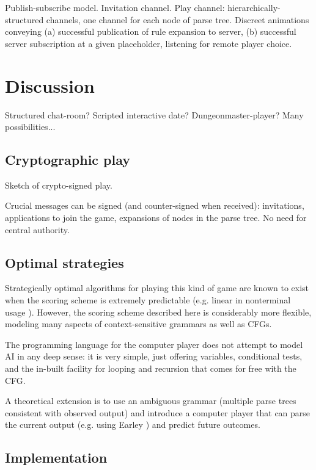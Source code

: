 \documentclass{acm_proc_article-sp}
\begin{document}
Publish-subscribe model.
Invitation channel.
Play channel: hierarchically-structured channels, one channel for each node of parse tree.
Discreet animations conveying (a) successful publication of rule expansion to server, (b) successful server subscription at a given placeholder, listening for remote player choice.

\section{Discussion}

Structured chat-room?
Scripted interactive date?
Dungeonmaster-player?
Many possibilities...


\subsection{Cryptographic play}

Sketch of crypto-signed play.

Crucial messages can be signed (and counter-signed when received): invitations, applications to join the game, expansions of nodes in the parse tree.
No need for central authority.

\subsection{Optimal strategies}

Strategically optimal algorithms for playing this kind of game are known to exist when the scoring scheme is extremely predictable (e.g. linear in nonterminal usage \cite{DBLP:conf/icalp/EtessamiWY08}).
However, the scoring scheme described here is considerably more flexible, modeling many aspects of context-sensitive grammars as well as CFGs.

The programming language for the computer player does not attempt to model AI in any deep sense:
it is very simple, just offering variables, conditional tests, and the in-built facility for looping and recursion that comes for free with the CFG.

A theoretical extension is to use an ambiguous grammar (multiple parse trees consistent with observed output)
and introduce a computer player that can parse the current output (e.g. using Earley \cite{Stolcke}) and predict future outcomes.

\subsection{Implementation}
\end{document}
